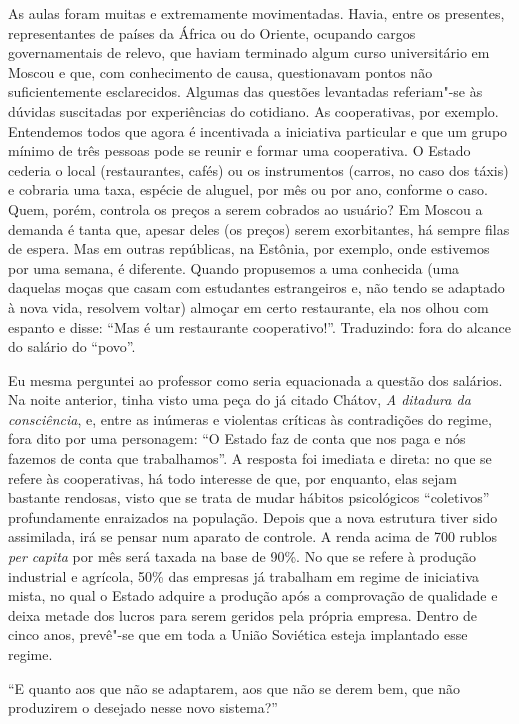 As aulas foram muitas e extremamente movimentadas. Havia, entre os presentes, representantes de países da África ou do Oriente, ocupando cargos governamentais de relevo, que haviam terminado algum curso universitário em Moscou e que, com conhecimento de causa, questionavam pontos não suficientemente esclarecidos. Algumas das questões levantadas referiam"-se às dúvidas suscitadas por experiências do cotidiano. As cooperativas, por exemplo. Entendemos todos que agora é incentivada a iniciativa particular e que um grupo mínimo de três pessoas pode se reunir e formar uma cooperativa. O Estado cederia o local (restaurantes, cafés) ou os instrumentos (carros, no caso dos táxis) e cobraria uma taxa, espécie de aluguel, por mês ou por ano, conforme o caso. Quem, porém, controla os preços a serem cobrados ao usuário? Em Moscou a demanda é tanta que, apesar deles (os preços) serem exorbitantes, há sempre filas de espera. Mas em outras repúblicas, na Estônia, por exemplo, onde estivemos por uma semana, é diferente. Quando propusemos a uma conhecida (uma daquelas moças que casam com estudantes estrangeiros e, não tendo se adaptado à nova vida, resolvem voltar) almoçar em certo restaurante, ela nos olhou com espanto e disse: ``Mas é um restaurante cooperativo!''. Traduzindo: fora do alcance do salário do ``povo''.

Eu mesma perguntei ao professor como seria equacionada a questão dos salários. Na noite anterior, tinha visto uma peça do já citado Chátov, \emph{A ditadura da consciência}, e, entre as inúmeras e violentas críticas às contradições do regime, fora dito por uma personagem: ``O Estado faz de conta que nos paga e nós fazemos de conta que trabalhamos''. A resposta foi imediata e direta: no que se refere às cooperativas, há todo interesse de que, por enquanto, elas sejam bastante rendosas, visto que se trata de mudar hábitos psicológicos ``coletivos'' profundamente enraizados na população. Depois que a nova estrutura tiver sido assimilada, irá se pensar num aparato de controle. A renda acima de 700 rublos \emph{per capita} por mês será taxada na base de 90\%. No que se refere à produção industrial e agrícola, 50\% das empresas já trabalham em regime de iniciativa mista, no qual o Estado
adquire a produção após a comprovação de qualidade e deixa metade dos lucros para serem geridos pela própria empresa. Dentro de cinco anos, prevê"-se que em toda a União Soviética esteja implantado esse regime.

``E quanto aos que não se adaptarem, aos que não se derem bem, que não produzirem o desejado nesse novo sistema?''

